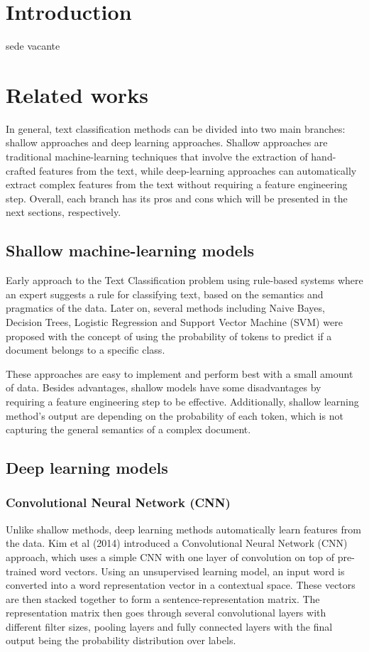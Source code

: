\documentclass[pdflatex,sn-mathphys]{sn-jnl}%
\theoremstyle{thmstyleone}%
\theoremstyle{thmstyletwo}%
\theoremstyle{thmstylethree}%
\begin{document}
\section{Introduction}\label{introduction}
sede vacante

\section{Related works}\label{relatedworks}
In general, text classification methods can be divided into two main branches: shallow approaches and deep learning approaches. Shallow approaches are traditional machine-learning techniques that involve the extraction of hand-crafted features from the text, while deep-learning approaches can automatically extract complex features from the text without requiring a feature engineering step. Overall, each branch has its pros and cons which will be presented in the next sections, respectively.

\subsection{Shallow machine-learning models}

Early approach to the Text Classification problem using rule-based systems where an expert suggests a rule for classifying text, based on the semantics and pragmatics of the data. Later on, several methods including Naive Bayes\cite{Xu2017}, Decision Trees\cite{Safavian1991}, Logistic Regression\cite{Genkin2007} and Support Vector Machine (SVM)\cite{boser1992, cortesvapnik1995} were proposed with the concept of using the probability of tokens to predict if a document belongs to a specific class. 

These approaches are easy to implement and perform best with a small amount of data. Besides advantages, shallow models have some disadvantages by requiring a feature engineering step to be effective. Additionally, shallow learning method's output are depending on the probability of each token, which is not capturing the general semantics of a complex document.

\subsection{Deep learning models}
\subsubsection{Convolutional Neural Network (CNN)}
Unlike shallow methods, deep learning methods automatically learn features from the data. Kim et al (2014) introduced a Convolutional Neural Network (CNN) approach, which uses a simple CNN with one layer of convolution on top of pre-trained word vectors\cite{Kim2014}. Using an unsupervised learning model, an input word is converted into a word representation vector in a contextual space. These vectors are then stacked together to form a sentence-representation matrix. The representation matrix then goes through several convolutional layers with different filter sizes, pooling layers and fully connected layers with the final output being the probability distribution over labels.
\end{document}
